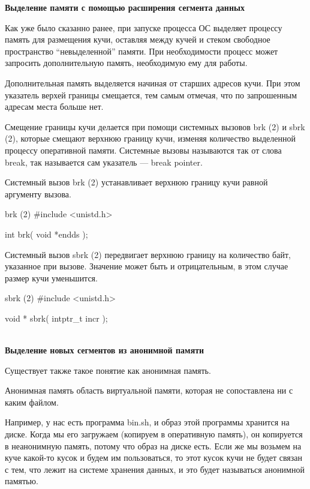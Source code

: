 \textbf{Выделение памяти с помощью расширения сегмента данных}

Как уже было сказанно ранее, при запуске процесса ОС выделяет процессу память для размещения кучи, оставляя между кучей и стеком свободное пространство “невыделенной” памяти. При необходимости процесс может запросить дополнительную память, необходимую ему для работы.

Дополнительная память выделяется начиная от старших адресов кучи. При этом указатель верхей границы смещается, тем самым отмечая, что по запрошенным адресам места больше нет.

Смещение границы кучи делается при помощи системных вызовов brk (2) и sbrk (2), которые смещают верхнюю границу кучи, изменяя количество выделенной процессу оперативной памяти. Системные вызовы называются так от слова break, так называется сам указатель --- break pointer.

Системный вызов brk (2) устанавливает верхнюю границу кучи равной аргументу вызова.

\begin{CCode}{brk (2)}
	#include <unistd.h>

	int brk(
		void *endds
	); \end{CCode}

Системный вызов sbrk (2) передвигает верхнюю границу на количество байт, указанное при вызове. Значение может быть и отрицательным, в этом случае размер кучи уменьшится.

\begin{CCode}{sbrk (2)}
	#include <unistd.h>

	void * sbrk(
		intptr_t incr
	); \end{CCode} 

~\\[1cm]
\textbf{Выделение новых сегментов из анонимной памяти}

Существует также такое понятие как анонимная память. 

\begin{defi}{Анонимная память}
	область виртуальной памяти, которая не сопоставлена ни с каким файлом.
\end{defi}

Например, у нас есть программа bin.sh, и образ этой программы хранится на диске. Когда мы его загружаем (копируем в оперативную память), он копируется в неанонимную память, потому что образ на диске есть. Если же мы возьмем на куче какой-то кусок и будем им пользоваться, то этот кусок кучи не будет связан с тем, что лежит на системе хранения данных, и это будет называться анонимной памятью. 

